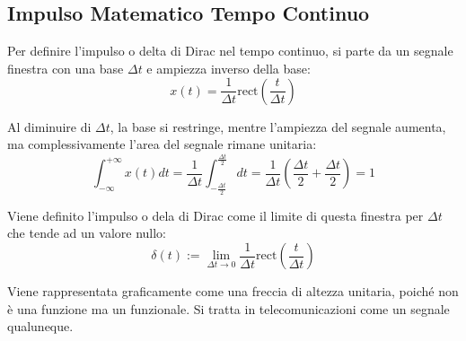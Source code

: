 \documentclass{article}
\numberwithin{equation}{subsection}
\begin{document}
\subsection{Impulso Matematico Tempo Continuo}

Per definire l'impulso o delta di Dirac nel tempo continuo, si parte da un segnale finestra con una base $\Delta t$ e ampiezza inverso della base:
\begin{equation*}
    x(t)=\displaystyle\frac{1}{\Delta t}\mbox{rect}\left(\frac{t}{\Delta t}\right)
\end{equation*}

\begin{center}
\end{center}

Al diminuire di $\Delta t$, la base si restringe, mentre l'ampiezza del segnale aumenta, ma complessivamente l'area del segnale rimane unitaria:
\begin{equation*}
    \displaystyle\int_{-\infty}^{+\infty}x(t)dt=\frac{1}{\Delta t}\int_{-\frac{\Delta t}{2}}^{\frac{\Delta t}{2}}dt=\frac{1}{\Delta t}\left(\frac{\Delta t}{2}+\frac{\Delta t}{2}\right)=1
\end{equation*}

Viene definito l'impulso o dela di Dirac come il limite di questa finestra per $\Delta t$ che tende ad un valore nullo:
\begin{equation*}
    \delta(t):=\lim_{\Delta t\to0}\displaystyle\frac{1}{\Delta t}\mbox{rect}\left(\frac{t}{\Delta t}\right)
\end{equation*}

Viene rappresentata graficamente come una freccia di altezza unitaria, poiché non è una funzione ma un funzionale. Si tratta in telecomunicazioni come un segnale qualuneque. 
\begin{center}
\end{center}
\end{document}

